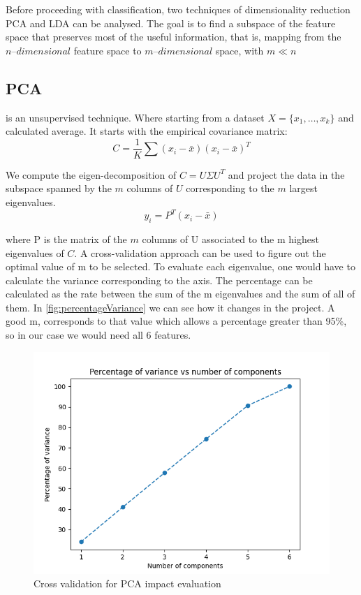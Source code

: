 
Before proceeding with classification, two techniques of dimensionality reduction PCA and LDA can be analysed.
The goal is to find a subspace of the feature space that preserves most of the useful information, that is, mapping from
the \(n\text{–}dimensional\) feature space to \(m\text{–}dimensional\) space, with
\(m \ll n\)


\subsection{PCA}
\label{subsec:pca} is an unsupervised technique.
Where starting from a dataset \(X = \{x_1, \dots,x_k\}\) and calculated average.
It starts with the empirical covariance matrix:
\begin{equation}
    C = \frac{1}{K} \sum (x_i - \bar{x})(x_i - \bar{x})^T
    \label{eq:covarianceMatrix}
\end{equation}

We compute the eigen-decomposition of \(C = U \Sigma U^T\) and project the data in the subspace
spanned by the \(m\) columns of \(U\) corresponding to the \(m\) largest eigenvalues.
\begin{equation}
    y_i = P^T(x_i - \bar{x})
    \label{eq:projection}
\end{equation}

where P is the matrix of the \(m\) columns of U associated to the m highest eigenvalues of \(C\).
A cross-validation approach can be used to figure out the optimal value of m to be selected.
To evaluate each eigenvalue, one would have to calculate the variance corresponding to the axis.
The percentage can be calculated as the rate between the sum of the m eigenvalues and the sum of all of them.
In \autoref{fig:percentageVariance} we can see how it changes in the project.
A good m, corresponds to that value which allows a percentage greater than 95\%, so in our case we would need all 6
features.

\begin{figure}[h!]
    \centering
    \includegraphics[width=0.5\linewidth]{Lab/03. Lab 03/Images/01. PercentageVariance_NumberOfComponents}
    \caption{Cross validation for PCA impact evaluation}
    \label{fig:percentageVariance}
\end{figure}

